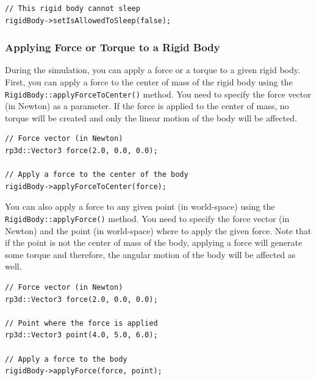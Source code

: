 \documentclass[a4paper,12pt]{article}
\begin{document}
   \begin{lstlisting}
// This rigid body cannot sleep
rigidBody->setIsAllowedToSleep(false);
 \end{lstlisting}

    \subsubsection{Applying Force or Torque to a Rigid Body}

    During the simulation, you can apply a force or a torque to a given rigid body. First, you can apply a force to the center of mass of the rigid body using the
    \texttt{RigidBody::applyForceToCenter()} method. You need to specify the force vector (in Newton) as a parameter. If the force is applied to the center of mass, no
    torque will be created and only the linear motion of the body will be affected. \\

    \begin{lstlisting}
// Force vector (in Newton)
rp3d::Vector3 force(2.0, 0.0, 0.0);

// Apply a force to the center of the body
rigidBody->applyForceToCenter(force);
  \end{lstlisting}

    \vspace{0.6cm}

    \begin{sloppypar}
        You can also apply a force to any given point (in world-space) using the \texttt{RigidBody::applyForce()} method. You need to specify the force vector (in Newton) and the point
        (in world-space) where to apply the given force. Note that if the point is not the center of mass of the body, applying a force will generate some torque and therefore, the
        angular motion of the body will be affected as well. \\
    \end{sloppypar}

    \begin{lstlisting}
// Force vector (in Newton)
rp3d::Vector3 force(2.0, 0.0, 0.0);

// Point where the force is applied
rp3d::Vector3 point(4.0, 5.0, 6.0);

// Apply a force to the body
rigidBody->applyForce(force, point);
  \end{lstlisting}

    \vspace{0.6cm}
\end{document}
